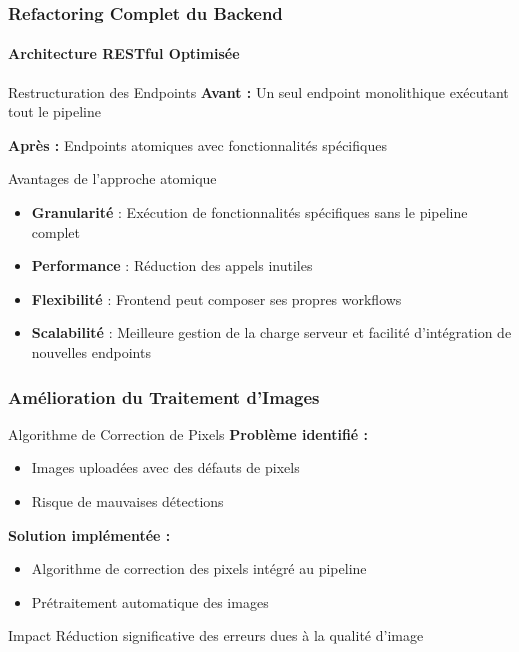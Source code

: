 \documentclass[
	11pt,
	aspectratio=169,
]{beamer}
\begin{document}
\begin{frame}
	\frametitle{Refactoring Complet du Backend}
	\framesubtitle{Architecture RESTful Optimisée}
	
	\begin{block}{Restructuration des Endpoints}
		\textbf{Avant :} Un seul endpoint monolithique exécutant tout le pipeline
		
		\bigskip
		
		\textbf{Après :} Endpoints atomiques avec fonctionnalités spécifiques
	\end{block}
	
	\smallskip
	
	\begin{exampleblock}{Avantages de l'approche atomique}
		\begin{itemize}
			\item \textbf{Granularité} : Exécution de fonctionnalités spécifiques sans le pipeline complet
			\item \textbf{Performance} : Réduction des appels inutiles
			\item \textbf{Flexibilité} : Frontend peut composer ses propres workflows
			\item \textbf{Scalabilité} : Meilleure gestion de la charge serveur
			et facilité d'intégration de nouvelles endpoints
		\end{itemize}
	\end{exampleblock}
\end{frame}


\begin{frame}
	\frametitle{Amélioration du Traitement d'Images}
	
	\begin{block}{Algorithme de Correction de Pixels}
		\textbf{Problème identifié :}
		\begin{itemize}
			\item Images uploadées avec des défauts de pixels
			\item Risque de mauvaises détections
		\end{itemize}

		\smallskip
		
		\textbf{Solution implémentée :}
		\begin{itemize}
			\item Algorithme de correction des pixels intégré au pipeline
			\item Prétraitement automatique des images
		\end{itemize}
	\end{block}
	
	\smallskip
	
	\begin{alertblock}{Impact}
		Réduction significative des erreurs dues à la qualité d'image
	\end{alertblock}
\end{frame}
\end{document}
